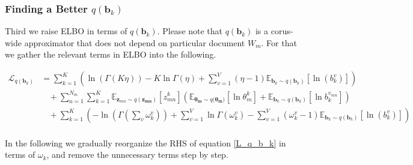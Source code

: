 \documentclass[a4]{article}
\begin{document}
\subsubsection{Finding a Better $q(\mathbf{b}_{k})$}
Third we raise ELBO in terms of $q(\mathbf{b}_{k})$.
Please note that $q(\mathbf{b}_{k})$ is a corus-wide approximator that does not depend on particular document $W_m$.
For that we gather the relevant terms in ELBO into the following.


\begin{equation}
\begin{aligned}
    \mathcal{L}_{q(\mathbf{b}_{k})}
&=
    \sum_{k=1}^K \left(
          \ln \left( \Gamma( K\eta ) \right) 
          - K\ln \Gamma(\eta) 
          + \sum_{v=1}^{V} (\eta - 1) 
               \mathbb{E}_{\mathbf{b}_k \sim q(\mathbf{b}_k)}
               [\ln(b_k^v)]
      \right)\\
&\:\:\:\:+
    \sum_{n=1}^{N_m} \sum_{k=1}^{K} 
        \mathbb{E}_{\mathbf{z}_{mn} \sim q(\mathbf{z_{mn}})} [z_{mn}^{k}] 
        \left(   \mathbb{E}_{\bm{\theta_m} \sim q(\bm{\theta_m)}}
                 [\ln \theta_m^k] 
               + \mathbb{E}_{\mathbf{b}_k \sim q(\mathbf{b}_k)}
                 [\ln b_{k}^{v_{mn}}] \right)\\
&\:\:\:\:+\sum_{k = 1}^{K} \left(
      - \ln \left( \Gamma( \sum_v \omega_k^v ) \right) 
          + \sum_{v=1}^{V} \ln \Gamma(\omega_k^v) 
          - \sum_{v=1}^{V} (\omega_k^v - 1)
            \mathbb{E}_{\mathbf{b}_k \sim q(\mathbf{b}_k)}[\ln(b_k^v)]
      \right)\label{L_q_b_k}\\
\end{aligned}
\end{equation}

In the following we gradually reorganize the RHS of equation \ref{L_q_b_k} in terms of $\omega_k$,
and remove the unnecessary terms step by step.
\end{document}
